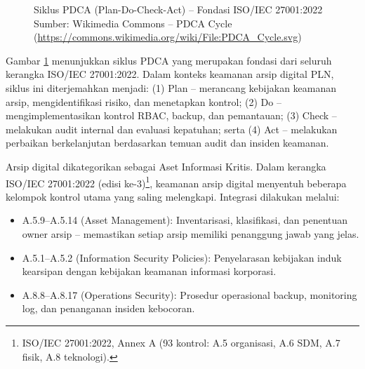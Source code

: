 \documentclass[12pt,a4paper]{report}
\begin{document}
\begin{figure}[H]
\centering
{}
\caption{Siklus PDCA (Plan-Do-Check-Act) -- Fondasi ISO/IEC 27001:2022\\
\small Sumber: Wikimedia Commons -- PDCA Cycle
(\url{https://commons.wikimedia.org/wiki/File:PDCA_Cycle.svg})}
\label{fig:pdca-cycle}
\end{figure}

\small Gambar \ref{fig:pdca-cycle} menunjukkan siklus PDCA yang merupakan fondasi dari seluruh kerangka ISO/IEC 27001:2022. Dalam konteks keamanan arsip digital PLN, siklus ini diterjemahkan menjadi: (1) Plan -- merancang kebijakan keamanan arsip, mengidentifikasi risiko, dan menetapkan kontrol; (2) Do -- mengimplementasikan kontrol RBAC, backup, dan pemantauan; (3) Check -- melakukan audit internal dan evaluasi kepatuhan; serta (4) Act -- melakukan perbaikan berkelanjutan berdasarkan temuan audit dan insiden keamanan.

Arsip digital dikategorikan sebagai Aset Informasi Kritis. Dalam kerangka ISO/IEC 27001:2022 (edisi ke-3)\footnote{ISO/IEC 27001:2022, Annex A (93 kontrol: A.5 organisasi, A.6 SDM, A.7 fisik, A.8 teknologi).}, keamanan arsip digital menyentuh beberapa kelompok kontrol utama yang saling melengkapi. Integrasi dilakukan melalui:
\begin{itemize}[leftmargin=*]
    \item A.5.9--A.5.14 (Asset Management): Inventarisasi, klasifikasi, dan penentuan owner arsip -- memastikan setiap arsip memiliki penanggung jawab yang jelas.
    \item A.5.1--A.5.2 (Information Security Policies): Penyelarasan kebijakan induk kearsipan dengan kebijakan keamanan informasi korporasi.
    \item A.8.8--A.8.17 (Operations Security): Prosedur operasional backup, monitoring log, dan penanganan insiden kebocoran.
\end{itemize}
\end{document}
